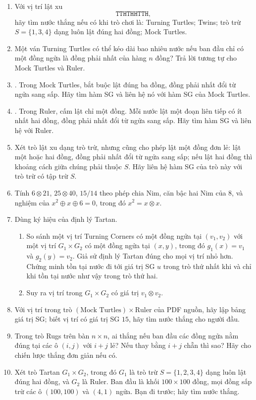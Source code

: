 \documentclass[11pt]{article}
\newcommand{\xor}{\mathbin{\oplus}}
\newcommand{\nimprod}{\mathbin{\otimes}}
\begin{document}
\begin{enumerate}
  \item Với vị trí lật xu
  \[
    \texttt{TTHTHHTTH},
  \]
  hãy tìm nước thắng nếu có khi trò chơi là: Turning Turtles; Twins; trò trừ
  \(S=\{1,3,4\}\) dạng luôn lật đúng hai đồng; Mock Turtles.
  \item Một ván Turning Turtles có thể kéo dài bao nhiêu nước nếu ban đầu chỉ
  có một đồng ngửa là đồng phải nhất của hàng \(n\) đồng? Trả lời tương tự cho
  Mock Turtles và Ruler.
  \item {}. Trong Mock Turtles, bắt buộc lật đúng ba đồng, đồng
  phải nhất đổi từ ngửa sang sấp. Hãy tìm hàm SG và liên hệ nó với hàm SG của
  Mock Turtles.
  \item {}. Trong Ruler, cấm lật chỉ một đồng. Mỗi nước lật một
  đoạn liên tiếp có ít nhất hai đồng, đồng phải nhất đổi từ ngửa sang sấp. Hãy
  tìm hàm SG và liên hệ với Ruler.
  \item Xét trò lật xu dạng trò trừ, nhưng cũng cho phép lật một đồng đơn lẻ:
  lật một hoặc hai đồng, đồng phải nhất đổi từ ngửa sang sấp; nếu lật hai
  đồng thì khoảng cách giữa chúng phải thuộc \(S\). Hãy liên hệ hàm SG của trò
  này với trò trừ có tập trừ \(S\).
  \item Tính \(6\nimprod21\), \(25\nimprod40\), \(15/14\) theo phép chia Nim,
  căn bậc hai Nim của \(8\), và nghiệm của
  \(x^2\xor x\xor6=0\), trong đó \(x^2=x\nimprod x\).
  \item Dùng ký hiệu của định lý Tartan.
  \begin{enumerate}
    \item So sánh một vị trí Turning Corners có một đồng ngửa tại
    \((v_1,v_2)\) với một vị trí \(G_1\times G_2\) có một đồng ngửa tại
    \((x,y)\), trong đó \(g_1(x)=v_1\) và \(g_2(y)=v_2\). Giả sử định lý Tartan
    đúng cho mọi vị trí nhỏ hơn. Chứng minh tồn tại nước đi tới giá trị SG
    \(u\) trong trò thứ nhất khi và chỉ khi tồn tại nước như vậy trong trò
    thứ hai.
    \item Suy ra vị trí trong \(G_1\times G_2\) có giá trị
    \(v_1\nimprod v_2\).
  \end{enumerate}
  \item Với vị trí trong trò \((\text{Mock Turtles})\times\text{Ruler}\) của
  PDF nguồn, hãy lập bảng giá trị SG; biết vị trí có giá trị SG \(15\), hãy
  tìm nước thắng cho người đầu.
  \item Trong trò Rugs trên bàn \(n\times n\), ai thắng nếu ban đầu các đồng
  ngửa nằm đúng tại các ô \((i,j)\) với \(i+j\) lẻ? Nếu thay bằng \(i+j\) chẵn
  thì sao? Hãy cho chiến lược thắng đơn giản nếu có.
  \item Xét trò Tartan \(G_1\times G_2\), trong đó \(G_1\) là trò trừ
  \(S=\{1,2,3,4\}\) dạng luôn lật đúng hai đồng, và \(G_2\) là Ruler. Ban đầu
  là khối \(100\times100\) đồng, mọi đồng sấp trừ các ô \((100,100)\) và
  \((4,1)\) ngửa. Bạn đi trước; hãy tìm nước thắng.
\end{enumerate}
\end{document}
